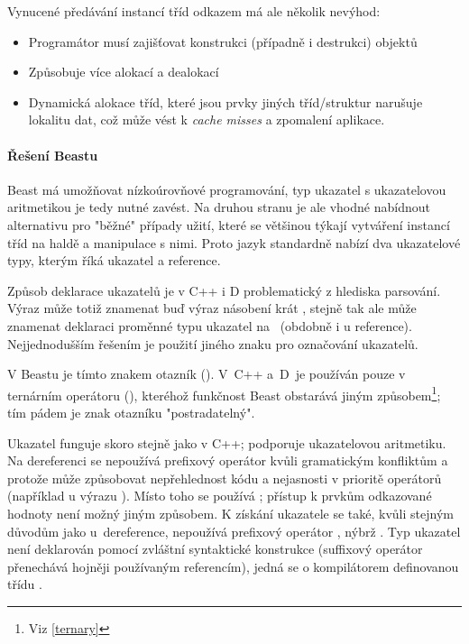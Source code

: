 Vynucené předávání instancí tříd odkazem má ale několik nevýhod:
\begin{itemize}
	\item Programátor musí zajišťovat konstrukci (případně i destrukci) objektů
	\item Způsobuje více alokací a dealokací
	\item Dynamická alokace tříd, které jsou prvky jiných tříd/struktur narušuje lokalitu dat, což může vést k \textit{cache misses} a zpomalení aplikace.
\end{itemize}

\paragraph{Řešení Beastu} 
Beast má umožňovat nízkoúrovňové programování, typ ukazatel s ukazatelovou aritmetikou je tedy nutné zavést. Na druhou stranu je ale vhodné nabídnout alternativu pro "běžné" případy užití, které se většinou týkají vytváření instancí tříd na haldě a manipulace s nimi. Proto jazyk standardně nabízí dva ukazatelové typy, kterým říká ukazatel a reference.

Způsob deklarace ukazatelů je v C++ i D problematický z hlediska parsování. Výraz  může totiž znamenat buď výraz násobení  krát , stejně tak ale může znamenat deklaraci proměnné  typu ukazatel na ~(obdobně i u reference). Nejjednodušším řešením je použití jiného znaku pro označování ukazatelů.

V Beastu je tímto znakem otazník (). V~C++ a~D~je používán pouze v ternárním operátoru (), kteréhož funkčnost Beast obstarává jiným způsobem\footnote{Viz \ref{ternary}}; tím pádem je znak otazníku "postradatelný".

Ukazatel funguje skoro stejně jako v C++; podporuje ukazatelovou aritmetiku. Na dereferenci se nepoužívá prefixový operátor  kvůli gramatickým konfliktům a protože může způsobovat nepřehlednost kódu a nejasnosti v prioritě operátorů (například u výrazu ). Místo toho se používá ; přístup k prvkům odkazované hodnoty není možný jiným způsobem. K získání ukazatele se také, kvůli stejným důvodům jako u~dereference, nepoužívá prefixový operátor , nýbrž . Typ ukazatel není deklarován pomocí zvláštní syntaktické konstrukce (suffixový operátor  přenechává hojněji používaným referencím), jedná se o kompilátorem definovanou třídu .

